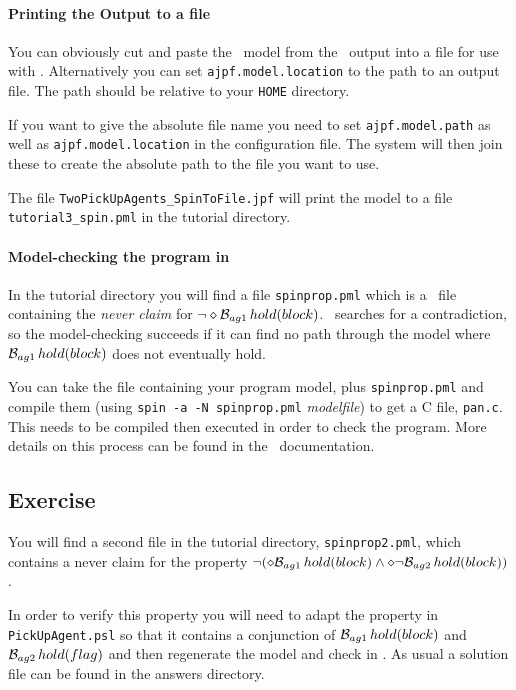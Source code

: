 \documentclass[a4]{article}
\begin{document}
\paragraph{Printing the Output to a file} You can obviously cut and paste the \promela\ model from the \ajpf\ output into a file for use with \spin.  Alternatively you can set \texttt{ajpf.model.location} to the path to an output file.  The path should be relative to your \texttt{HOME} directory.  

If you want to give the absolute file name you need to set \texttt{ajpf.model.path} as well as \texttt{ajpf.model.location} in the configuration file.  The system will then join these to create the absolute path to the file you want to use.

The file \texttt{TwoPickUpAgents\_SpinToFile.jpf} will print the model to a file \texttt{tutorial3\_spin.pml} in the tutorial directory.

\paragraph{Model-checking the program in \spin}  In the tutorial directory you will find a file \texttt{spinprop.pml} which is a \promela\ file containing the \emph{never claim} for $\neg \diamond \mathrm{{\cal B}}_{ag1} \, hold(block)$.  \spin\ searches for a contradiction, so the model-checking succeeds if it can find no path through the model where $\mathrm{{\cal B}}_{ag1} \, hold(block)$ does not eventually hold.  

You can take the file containing  your program model, plus \texttt{spinprop.pml} and compile them (using \texttt{spin -a -N spinprop.pml} \emph{modelfile}) to get a C file, \texttt{pan.c}.  This needs to be compiled then executed in order to check the program.  More details on this process can be found in the \spin\ documentation.

\subsection{Exercise}

You will find a second file in the tutorial directory, \texttt{spinprop2.pml}, which contains a never claim for the property $\neg (\diamond \mathrm{{\cal B}}_{ag1} \, hold(block) \wedge \diamond \neg \mathrm{{\cal B}}_{ag2} \, hold(block))$.

\begin{sloppypar}
In order to verify this property you will need to adapt the property in \texttt{PickUpAgent.psl} so that it contains a  conjunction of $\mathrm{{\cal B}}_{ag1} \, hold(block)$ and $\mathrm{{\cal B}}_{ag2} \, hold(flag)$ and then regenerate the model and check in \spin.  As usual a solution file can be found in the answers directory.
\end{sloppypar}
\end{document}
